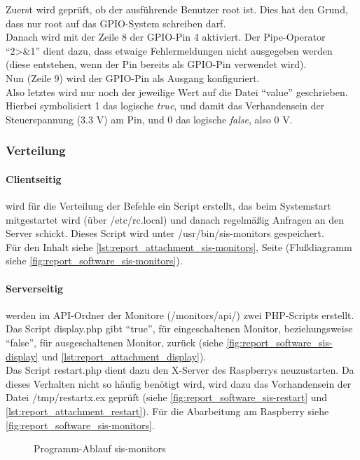 Zuerst wird geprüft, ob der ausführende Benutzer root ist. Dies hat den Grund, dass nur root auf das GPIO-System schreiben darf.\\
Danach wird mit der Zeile 8 der GPIO-Pin 4 aktiviert. Der Pipe-Operator \enquote{2>\&1} dient dazu, dass etwaige Fehlermeldungen nicht ausgegeben werden (diese entstehen, wenn der Pin bereits als GPIO-Pin verwendet wird).\\
Nun (Zeile 9) wird der GPIO-Pin als Ausgang konfiguriert.\\
Also letztes wird nur noch der jeweilige Wert auf die Datei \enquote{value} geschrieben. Hierbei symbolisiert 1 das logische \textit{true}, und damit das Verhandensein der Steuerspannung (3.3 V) am Pin, und 0 das logische \textit{false}, also 0 V.

\subsubsection{Verteilung}

\paragraph{Clientseitig}
wird für die Verteilung der Befehle ein Script erstellt, das beim Systemstart mitgestartet wird (über /etc/rc.local) und danach regelmäßig Anfragen an den Server schickt.
Dieses Script wird unter /usr/bin/sis-monitors gespeichert.\\
Für den Inhalt siehe \autoref{lst:report_attachment_sis-monitors}, Seite \pageref{lst:report_attachment_sis-monitors} (Flußdiagramm siehe \autoref{fig:report_software_sis-monitors}).\\

\paragraph{Serverseitig} werden im API-Ordner der Monitore (/monitors/api/) zwei PHP-Scripts erstellt.\\
Das Script display.php gibt \enquote{true}, für eingeschaltenen Monitor, beziehungsweise \enquote{false}, für ausgeschaltenen Monitor, zurück (siehe \autoref{fig:report_software_sis-display} und \autoref{lst:report_attachment_display}).\\
Das Script restart.php dient dazu den X-Server des Raspberrys neuzustarten. Da dieses Verhalten nicht so häufig benötigt wird, wird dazu das Vorhandensein der Datei /tmp/restartx.ex geprüft (siehe \autoref{fig:report_software_sis-restart} und \autoref{lst:report_attachment_restart}). Für die Abarbeitung am Raspberry siehe \autoref{fig:report_software_sis-monitors}.
\\
\begin{figure}[H]
\centering
{}
\caption{Programm-Ablauf sis-monitors}
\label{fig:report_software_sis-monitors}
\end{figure}

